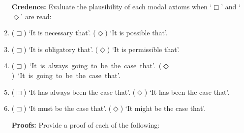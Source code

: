 \documentclass[a4paper, 11pt]{article} %
\begin{document}
\begin{enumerate}[leftmargin=1.2in,itemsep=1pt]\small
	\item[\bf Credence:] Evaluate the plausibility of each modal axioms when `$\Box$' and `$\Diamond$' are read:
      \item ($\Box$) `It is necessary that'. ($\Diamond$) `It is possible that'.
      \item ($\Box$) `It is obligatory that'. ($\Diamond$) `It is permissible that'.
      \item \mbox{($\Box$) `It is always going to be the case that'. ($\Diamond$) `It is going to be the case that'.}
      \item ($\Box$) `It has always been the case that'. ($\Diamond$) `It has been the case that'.
      \item ($\Box$) `It must be the case that'. ($\Diamond$) `It might be the case that'.
	\item[\bf Proofs:] Provide a proof of each of the following:
\end{enumerate}
\end{document}
